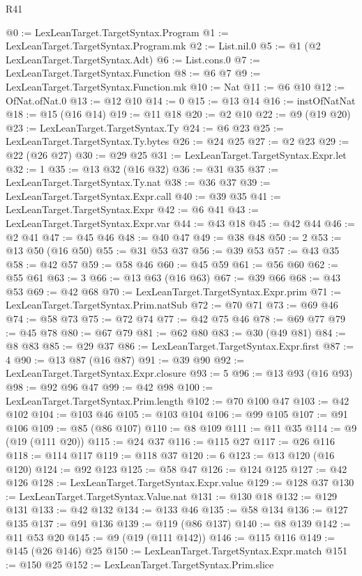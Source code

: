 \begin{lexlean}{R41}
\begin{coremodule}
@0 := LexLeanTarget.TargetSyntax.Program
@1 := LexLeanTarget.TargetSyntax.Program.mk
@2 := List.nil.{0}
@5 := @1 (@2 LexLeanTarget.TargetSyntax.Adt)
@6 := List.cons.{0}
@7 := LexLeanTarget.TargetSyntax.Function
@8 := @6 @7
@9 := LexLeanTarget.TargetSyntax.Function.mk
@10 := Nat
@11 := @6 @10
@12 := OfNat.ofNat.{0}
@13 := @12 @10
@14 := 0
@15 := @13 @14
@16 := instOfNatNat
@18 := @15 (@16 @14)
@19 := @11 @18
@20 := @2 @10
@22 := @9 (@19 @20)
@23 := LexLeanTarget.TargetSyntax.Ty
@24 := @6 @23
@25 := LexLeanTarget.TargetSyntax.Ty.bytes
@26 := @24 @25
@27 := @2 @23
@29 := @22 (@26 @27)
@30 := @29 @25
@31 := LexLeanTarget.TargetSyntax.Expr.let
@32 := 1
@35 := @13 @32 (@16 @32)
@36 := @31 @35
@37 := LexLeanTarget.TargetSyntax.Ty.nat
@38 := @36 @37
@39 := LexLeanTarget.TargetSyntax.Expr.call
@40 := @39 @35
@41 := LexLeanTarget.TargetSyntax.Expr
@42 := @6 @41
@43 := LexLeanTarget.TargetSyntax.Expr.var
@44 := @43 @18
@45 := @42 @44
@46 := @2 @41
@47 := @45 @46
@48 := @40 @47
@49 := @38 @48
@50 := 2
@53 := @13 @50 (@16 @50)
@55 := @31 @53 @37
@56 := @39 @53
@57 := @43 @35
@58 := @42 @57
@59 := @58 @46
@60 := @45 @59
@61 := @56 @60
@62 := @55 @61
@63 := 3
@66 := @13 @63 (@16 @63)
@67 := @39 @66
@68 := @43 @53
@69 := @42 @68
@70 := LexLeanTarget.TargetSyntax.Expr.prim
@71 := LexLeanTarget.TargetSyntax.Prim.natSub
@72 := @70 @71
@73 := @69 @46
@74 := @58 @73
@75 := @72 @74
@77 := @42 @75 @46
@78 := @69 @77
@79 := @45 @78
@80 := @67 @79
@81 := @62 @80
@83 := @30 (@49 @81)
@84 := @8 @83
@85 := @29 @37
@86 := LexLeanTarget.TargetSyntax.Expr.first
@87 := 4
@90 := @13 @87 (@16 @87)
@91 := @39 @90
@92 := LexLeanTarget.TargetSyntax.Expr.closure
@93 := 5
@96 := @13 @93 (@16 @93)
@98 := @92 @96 @47
@99 := @42 @98
@100 := LexLeanTarget.TargetSyntax.Prim.length
@102 := @70 @100 @47
@103 := @42 @102
@104 := @103 @46
@105 := @103 @104
@106 := @99 @105
@107 := @91 @106
@109 := @85 (@86 @107)
@110 := @8 @109
@111 := @11 @35
@114 := @9 (@19 (@111 @20))
@115 := @24 @37
@116 := @115 @27
@117 := @26 @116
@118 := @114 @117
@119 := @118 @37
@120 := 6
@123 := @13 @120 (@16 @120)
@124 := @92 @123
@125 := @58 @47
@126 := @124 @125
@127 := @42 @126
@128 := LexLeanTarget.TargetSyntax.Expr.value
@129 := @128 @37
@130 := LexLeanTarget.TargetSyntax.Value.nat
@131 := @130 @18
@132 := @129 @131
@133 := @42 @132
@134 := @133 @46
@135 := @58 @134
@136 := @127 @135
@137 := @91 @136
@139 := @119 (@86 @137)
@140 := @8 @139
@142 := @11 @53 @20
@145 := @9 (@19 (@111 @142))
@146 := @115 @116
@149 := @145 (@26 @146) @25
@150 := LexLeanTarget.TargetSyntax.Expr.match
@151 := @150 @25
@152 := LexLeanTarget.TargetSyntax.Prim.slice

\end{coremodule}
\end{lexlean}

